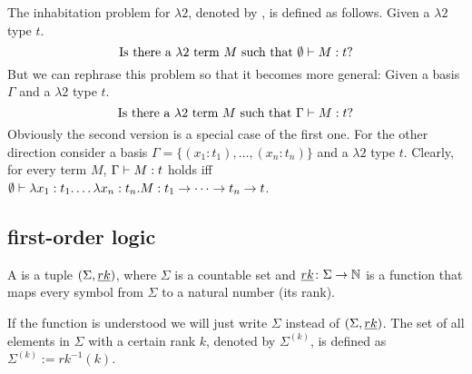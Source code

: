 \begin{definition}
The inhabitation problem for $\lambda2$, denoted by \lambdaInhab, is defined as follows. Given a $\lambda2$ type $t$.
\[\text{Is there a $\lambda2$ term $M$ such that } \emptyset\vdash M:t?\]
But we can rephrase this problem so that it becomes more general:
Given a basis $\Gamma$ and a $\lambda2$ type $t$.
\[\text{Is there a $\lambda2$ term $M$ such that } \Gamma\vdash M:t?\]
Obviously the second version is a special case of the first one. For the other direction consider a basis $\Gamma=\{(x_1:t_1),\dots,(x_n:t_n)\}$ and a $\lambda2$ type $t$. Clearly, for every term $M$, $\Gamma\vdash M:t$ holds iff $\emptyset\vdash \lambda x_1:t_1.\dots\lambda x_n:t_n.M:t_1\to\dots\to t_n\to t$.
\end{definition}
\subsection{first-order logic}
\begin{definition}
	A  is a tuple $(\Sigma,\emph{rk})$, where $\Sigma$ is a countable set and $\emph{rk}\colon\Sigma\to\mathbb{N}$ is a function that maps every symbol from $\Sigma$ to a natural number (its rank).
\end{definition}
If the function \rank{} is understood we will just write $\Sigma$ instead of $(\Sigma,\emph{rk})$. The set of all elements in $\Sigma$ with a certain rank $k$, denoted by $\Sigma^{(k)}$, is defined as $\Sigma^{(k)}:=rk^{-1}(k)$. 

